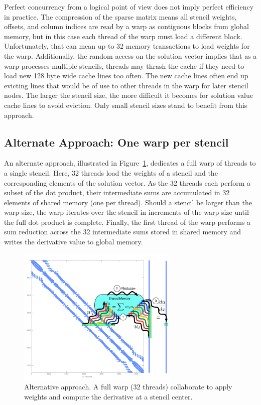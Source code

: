 \documentclass{report}
\begin{document}
Perfect concurrency from a logical point of view does not 
imply perfect efficiency in practice. The compression of the sparse matrix means all stencil weights, offsets, and column indices are read by a warp as contiguous blocks from global memory, but in this case each thread of the warp must load a different block. Unfortunately, that can mean up to 32 memory transactions to load weights for the warp. Additionally, the random access on the solution vector implies that as a warp processes multiple stencils, threads may thrash the cache if they need to load new 128 byte wide cache lines too often. The new cache lines often end up evicting lines that would be of use to other threads in the warp for later stencil nodes. The larger the stencil size, the more difficult it becomes for solution value cache lines to avoid eviction. Only small stencil sizes stand to benefit from this approach. 




\subsection{Alternate Approach: One warp per stencil} 

An alternate approach, illustrated in Figure~\ref{fig:oneWarpPerStencil}, dedicates a full warp of threads to a single stencil. Here, 32 threads load the weights of a stencil and the corresponding elements of the solution vector. As the 32 threads each perform a subset of the dot product, their intermediate sums are accumulated in 32 elements of shared memory (one per thread).
Should  a stencil be larger than the warp size, the warp iterates over the stencil in increments of the warp size until the full dot product is complete. Finally, the first thread of the warp performs a sum reduction across the 32 intermediate sums stored in shared memory and writes the derivative value to global memory. 

\begin{figure}[ht]
      \centering
       \includegraphics[width=3in]{../figures/paper1/figures/omnigraffle/oneWarpPerStencil.pdf}
      \caption{Alternative approach. A full warp (32 threads) collaborate to apply weights  and compute the derivative at a stencil center. }
      \label{fig:oneWarpPerStencil}
\end{figure}
\end{document}
